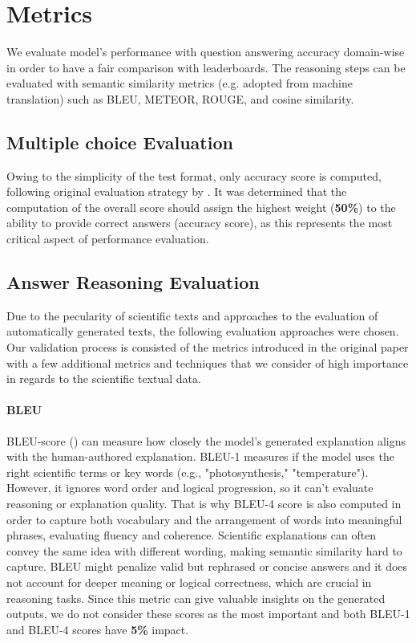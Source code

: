\documentclass{article}
\begin{document}
\section{Metrics}
We evaluate model's performance with question answering accuracy domain-wise in order to have a fair comparison with leaderboards. The reasoning steps can be evaluated with semantic similarity metrics (e.g. adopted from machine translation) such as BLEU, METEOR, ROUGE, and cosine similarity.
\subsection{Multiple choice Evaluation}
Owing to the simplicity of the test format, only accuracy score is computed, following original evaluation strategy by \cite{lu2022learn}. It was determined that the computation of the overall score should assign the highest weight (\textbf{50\%}) to the ability to provide correct answers (accuracy score), as this represents the most critical aspect of performance evaluation.
\subsection{Answer Reasoning Evaluation}
Due to the pecularity of scientific texts and approaches to the evaluation of automatically generated texts, the following evaluation approaches were chosen. Our validation process is consisted of the metrics introduced in the original paper \cite{lu2022learn}  with a few additional metrics and techniques that we consider of high importance in regards to the scientific textual data.

\paragraph{BLEU}
BLEU-score (\cite{papineni2002bleu}) can measure how closely the model's generated explanation aligns with the human-authored explanation. BLEU-1 measures if the model uses the right scientific terms or key words (e.g., "photosynthesis," "temperature"). However, it ignores word order and logical progression, so it can’t evaluate reasoning or explanation quality. That is why BLEU-4 score is also computed in order to capture both vocabulary and the arrangement of words into meaningful phrases, evaluating fluency and coherence.
Scientific explanations can often convey the same idea with different wording, making semantic similarity hard to capture.
BLEU might penalize valid but rephrased or concise answers and it does not account for deeper meaning or logical correctness, which are crucial in reasoning tasks. Since this metric can give valuable insights on the generated outputs, we do not consider these scores as the most important and both BLEU-1 and BLEU-4 scores have \textbf{5\%} impact.
\end{document}
